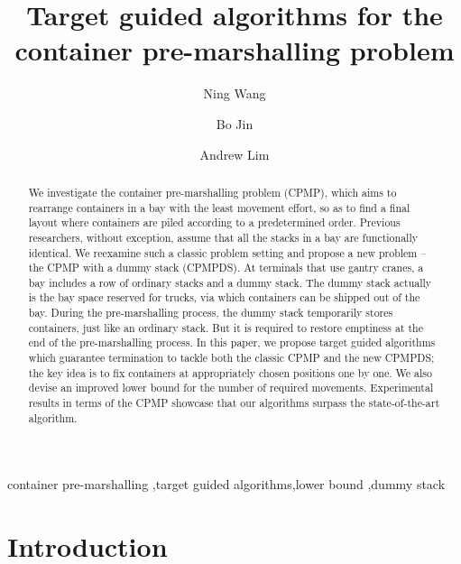 \documentclass[review,3p,times,authoryear,12pt]{elsarticle}
\begin{document}
\graphicspath{{./figure/}}
\begin{frontmatter}
\newpage

\title{Target guided algorithms for the container pre-marshalling problem}

\author{Ning Wang}

\author{Bo Jin}

\author{Andrew Lim}

\address{
Department of Management Sciences, City University of Hong Kong, 83 Tat Chee Ave, Kowloon Tong, Hong Kong
}

\begin{abstract}
We investigate the container pre-marshalling problem (CPMP), which aims to rearrange containers in a bay with the least movement effort, so as to find a final layout where containers are piled according to a predetermined order. Previous researchers, without exception, assume that all the stacks in a bay are functionally identical. We reexamine such a classic problem setting and propose a new problem -- the CPMP with a dummy stack (CPMPDS).
At terminals that use gantry cranes, a bay includes a row of ordinary stacks and a dummy stack. The dummy stack actually is the bay space reserved for trucks, via which containers can be shipped out of the bay. During the pre-marshalling process, the dummy stack temporarily stores containers, just like an ordinary stack.
But it is required to restore emptiness at the end of the pre-marshalling process. In this paper, we propose target guided algorithms which guarantee termination to tackle both the classic CPMP and the new CPMPDS; the key idea is to fix containers at appropriately chosen positions one by one. We also devise an improved lower bound for the number of required movements. Experimental results in terms of the CPMP showcase that our algorithms surpass the state-of-the-art algorithm.
\end{abstract}

\begin{keyword}
container pre-marshalling \sep target guided algorithms\sep lower bound \sep dummy stack
\end{keyword}
\end{frontmatter}

\section{Introduction}
\end{document}
